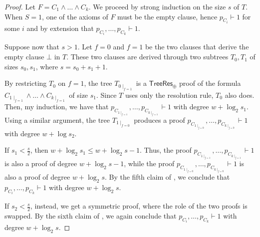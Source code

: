 \begin{proof}
 Let $F = C_1 \land \ldots \land C_k$. We proceed by strong induction on the size $s$ of $T$. When $S = 1$, one of the axioms of $F$ must be the empty clause, hence $p_{C_i} \vdash 1$ for some $i$ and by extension that $p_{C_i}, \ldots, p_{C_k} \vdash 1$.

 Suppose now that $s > 1$. Let $f = 0$ and $f = 1$ be the two clauses that derive the empty clause $\bot$ in $T$. These two clauses are derived through two subtrees $T_0, T_1$ of sizes $s_0, s_1$, where $s = s_0+s_1+1$. 
    
 By restricting $T_0$ on $f = 1$, the tree $T_{0 \mid_{f = 1}}$ is a $\mathsf{TreeRes}_\oplus$ proof of the formula $C_{1 \mid_{f = 1}} \land \ldots \land C_{k \mid_{f = 1}}$ of size $s_1$. Since $T$ uses only the resolution rule, $T_0$ also does. Then, my induction, we have that $p_{C_{1 \mid_{f = 1}}}, \ldots, p_{C_{k \mid_{f = 1}}} \vdash 1$ with degree $w + \log_2 s_1$. Using a similar argument, the tree $T_{1 \mid_{f = 0}}$ produces a proof $p_{C_{1 \mid_{f = 0}}}, \ldots, p_{C_{k \mid_{f = 0}}} \vdash 1$ with degree $w + \log s_2$.

 If $s_1 < \frac{s}{2}$, then $w + \log_2 s_1 \leq w + \log_2 s - 1$. Thus, the proof $p_{C_{1 \mid_{f = 1}}}, \ldots, p_{C_{k \mid_{f = 1}}} \vdash 1$ is also a proof of degree $w + \log_2 s - 1$, while the proof $p_{C_{1 \mid_{f = 0}}}, \ldots, p_{C_{k \mid_{f = 0}}} \vdash 1$ is also a proof of degree $w + \log_2 s$. By the fifth claim of , we conclude that $p_{C_i}, \ldots, p_{C_k} \vdash 1$ with degree $w + \log_2 s$.

 If $s_2 < \frac{s}{2}$, instead, we get a symmetric proof, where the role of the two proofs is swapped. By the sixth claim of , we again conclude that $p_{C_i}, \ldots, p_{C_k} \vdash 1$ with degree $w + \log_2 s$.
\end{proof}

